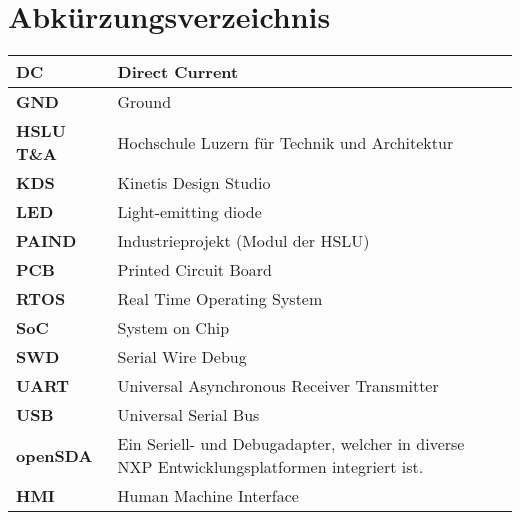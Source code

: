 \newpage
\section*{Abkürzungsverzeichnis}\label{dok:glossar}
\begin{table}[H]
	\begin{tabular}{|L{2.5cm}|L{13cm}|}
		\hline	
		\textbf{DC} & Direct Current\\
		
		\hline
		\textbf{GND} & Ground\\
		
		\hline
		\textbf{HSLU T\&A} & Hochschule Luzern für Technik und Architektur\\ 
		
		\hline
		\textbf{KDS} & Kinetis Design Studio\\

		\hline
		\textbf{LED} & Light-emitting diode\\
		
	 	\hline
	 	\textbf{PAIND} &  Industrieprojekt (Modul der HSLU) \\ 
	 	
	 	\hline
	 	\textbf{PCB} &	Printed Circuit Board\\
				
		\hline
		\textbf{RTOS} & Real Time Operating System \\
		
		\hline
		\textbf{SoC} &	System on Chip\\
		
		\hline
		\textbf{SWD} &	Serial Wire Debug\\
		
		\hline
		\textbf{UART} &	Universal Asynchronous Receiver Transmitter\\
		
		\hline
		\textbf{USB} &	Universal Serial Bus\\		
		
		\hline
		\textbf{openSDA} & Ein Seriell- und Debugadapter, welcher in diverse NXP Entwicklungsplatformen integriert ist.\\
		
		\hline
		\textbf{HMI} & Human Machine Interface\\
				
		\hline
	\end{tabular} 
	\vspace{0.2cm}
\end{table}


